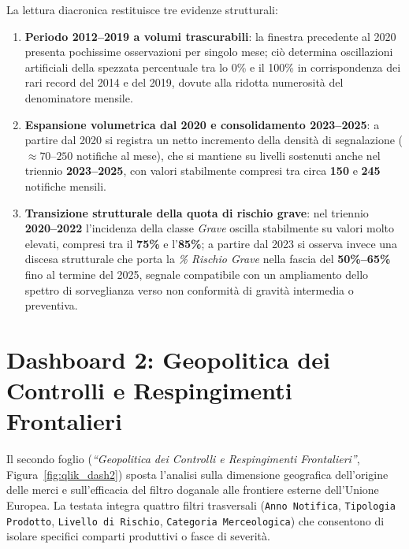 La lettura diacronica restituisce tre evidenze strutturali:
\begin{enumerate}
    \item \textbf{Periodo 2012--2019 a volumi trascurabili}: la finestra precedente al 2020 presenta pochissime osservazioni per singolo mese; ciò determina oscillazioni artificiali della spezzata percentuale tra lo 0\% e il 100\% in corrispondenza dei rari record del 2014 e del 2019, dovute alla ridotta numerosità del denominatore mensile.
    \item \textbf{Espansione volumetrica dal 2020 e consolidamento 2023--2025}: a partire dal 2020 si registra un netto incremento della densità di segnalazione ($\approx 70$--$250$ notifiche al mese), che si mantiene su livelli sostenuti anche nel triennio \textbf{2023--2025}, con valori stabilmente compresi tra circa \textbf{150} e \textbf{245} notifiche mensili.
    \item \textbf{Transizione strutturale della quota di rischio grave}: nel triennio \textbf{2020--2022} l'incidenza della classe \textit{Grave} oscilla stabilmente su valori molto elevati, compresi tra il \textbf{75\%} e l'\textbf{85\%}; a partire dal 2023 si osserva invece una discesa strutturale che porta la \textit{\% Rischio Grave} nella fascia del \textbf{50\%--65\%} fino al termine del 2025, segnale compatibile con un ampliamento dello spettro di sorveglianza verso non conformità di gravità intermedia o preventiva.
\end{enumerate}

\section{Dashboard 2: Geopolitica dei Controlli e Respingimenti Frontalieri}
\label{sec:qlik_dash2}

Il secondo foglio (\textit{``Geopolitica dei Controlli e Respingimenti Frontalieri''}, Figura~\ref{fig:qlik_dash2}) sposta l'analisi sulla dimensione geografica dell'origine delle merci e sull'efficacia del filtro doganale alle frontiere esterne dell'Unione Europea. La testata integra quattro filtri trasversali (\texttt{Anno Notifica}, \texttt{Tipologia Prodotto}, \texttt{Livello di Rischio}, \texttt{Categoria Merceologica}) che consentono di isolare specifici comparti produttivi o fasce di severità.


